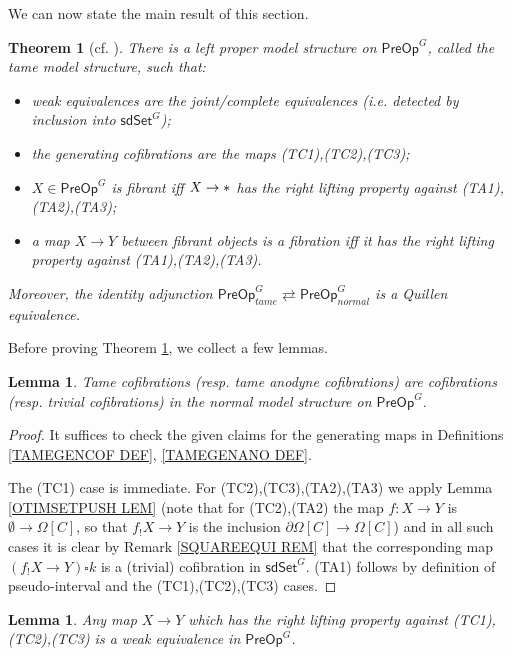 \documentclass[a4paper,10pt
,draft
]{article}%
\numberwithin{equation}{section}
\numberwithin{figure}{section}
\newtheorem{theorem}[equation]{Theorem}%
\newtheorem{lemma}[equation]{Lemma}%
\theoremstyle{definition} %
\newcommand{\1}{\ensuremath{\mathbbm 1}}%
\begin{document}
We can now state the main result of this section.

\begin{theorem}[{cf. \cite[Thm. 7.19]{CM13b}}]
      \label{TAMEMS_THM}
	There is a left proper model structure on 
	$\mathsf{PreOp}^G$,
	called the \emph{tame model structure},
	such that:
	\begin{itemize}
		\item weak equivalences are the 
		joint/complete equivalences 
		(i.e. detected by inclusion into $\mathsf{sdSet}^G$);
		\item the generating cofibrations are the maps (TC1),(TC2),(TC3);
		\item $X \in \mathsf{PreOp}^G$ is fibrant iff
		$X \to \**$ has the right lifting property against 
		(TA1),(TA2),(TA3);
		\item a map $X \to Y$ between fibrant objects is a fibration iff
		it has the right lifting property against 
		(TA1),(TA2),(TA3).
	\end{itemize}
	Moreover, the identity adjunction
	$
	\mathsf{PreOp}^G_{tame} 
	\rightleftarrows
	\mathsf{PreOp}^G_{normal} 
	$
	is a Quillen equivalence.
\end{theorem}


Before proving Theorem \ref{TAMEMS_THM},
we collect a few lemmas.

\begin{lemma}\label{TAMECOFCOF_LEM}
	Tame cofibrations (resp. tame anodyne cofibrations) are  cofibrations (resp. trivial cofibrations) in the normal model structure on $\mathsf{PreOp}^G$.
\end{lemma}


\begin{proof}
	It suffices to check the given claims for the generating maps
	in Definitions \ref{TAMEGENCOF DEF}, \ref{TAMEGENANO DEF}.
	
	The (TC1) case is immediate.
	For (TC2),(TC3),(TA2),(TA3)
	we apply 
	Lemma \ref{OTIMSETPUSH LEM}
	(note that for (TC2),(TA2)
	the map $f\colon X \to Y$ is $\emptyset \to \Omega[C]$,
	so that $f_!X \to Y$ is the inclusion
	$\partial \Omega[C] \to \Omega[C]$)
	and in all such cases it is 
	clear by Remark \ref{SQUAREEQUI REM} that the 
	corresponding map $(f_!X \to Y) \square k$
	is a (trivial) cofibration in $\mathsf{sdSet}^G$.
	(TA1) follows by definition of pseudo-interval
	and the 
	(TC1),(TC2),(TC3) cases.
\end{proof}



\begin{lemma}\label{TAMETRIVFIB LEM}
	Any map $X \to Y$ which has the right lifting property against 
	(TC1),(TC2),(TC3)
	is a weak equivalence in 
	$\mathsf{PreOp}^G$.
\end{lemma}
\end{document}

